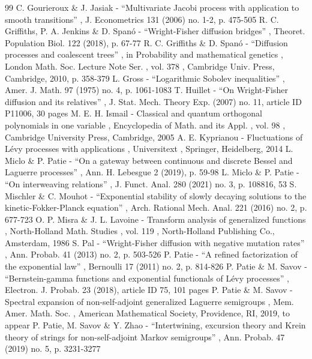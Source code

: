 \documentclass[11pt]{article}
\numberwithin{equation}{section}
\begin{document}
\begin{thebibliography}{99}
 C. Gourieroux \& J. Jasiak - “Multivariate Jacobi process with application to smooth transitions” , J. Econometrics 131 (2006) no. 1-2, p. 475-505
 R. C. Griffiths, P. A. Jenkins \& D. Spanó - “Wright-Fisher diffusion bridges” , Theoret. Population Biol. 122 (2018), p. 67-77
 R. C. Griffiths \& D. Spanó - “Diffusion processes and coalescent trees” , in Probability and mathematical genetics , London Math. Soc. Lecture Note Ser. , vol. 378 , Cambridge Univ. Press, Cambridge, 2010, p. 358-379
 L. Gross - “Logarithmic Sobolev inequalities” , Amer. J. Math. 97 (1975) no. 4, p. 1061-1083
 T. Huillet - “On Wright-Fisher diffusion and its relatives” , J. Stat. Mech. Theory Exp. (2007) no. 11, article ID P11006, 30 pages
 M. E. H. Ismail - Classical and quantum orthogonal polynomials in one variable , Encyclopedia of Math. and its Appl. , vol. 98 , Cambridge University Press, Cambridge, 2005
 A. E. Kyprianou - Fluctuations of Lévy processes with applications , Universitext , Springer, Heidelberg, 2014
 L. Miclo \& P. Patie - “On a gateway between continuous and discrete Bessel and Laguerre processes” , Ann. H. Lebesgue 2 (2019), p. 59-98
 L. Miclo \& P. Patie - “On interweaving relations” , J. Funct. Anal. 280 (2021) no. 3, p. 108816, 53
 S. Mischler \& C. Mouhot - “Exponential stability of slowly decaying solutions to the kinetic-Fokker-Planck equation” , Arch. Rational Mech. Anal. 221 (2016) no. 2, p. 677-723
 O. P. Misra \& J. L. Lavoine - Transform analysis of generalized functions , North-Holland Math. Studies , vol. 119 , North-Holland Publishing Co., Amsterdam, 1986
 S. Pal - “Wright-Fisher diffusion with negative mutation rates” , Ann. Probab. 41 (2013) no. 2, p. 503-526
 P. Patie - “A refined factorization of the exponential law” , Bernoulli 17 (2011) no. 2, p. 814-826
 P. Patie \& M. Savov - “Bernstein-gamma functions and exponential functionals of Lévy processes” , Electron. J. Probab. 23 (2018), article ID 75, 101 pages
 P. Patie \& M. Savov - Spectral expansion of non-self-adjoint generalized Laguerre semigroups , Mem. Amer. Math. Soc. , American Mathematical Society, Providence, RI, 2019, to appear
 P. Patie, M. Savov \& Y. Zhao - “Intertwining, excursion theory and Krein theory of strings for non-self-adjoint Markov semigroups” , Ann. Probab. 47 (2019) no. 5, p. 3231-3277

\end{thebibliography}
\end{document}
